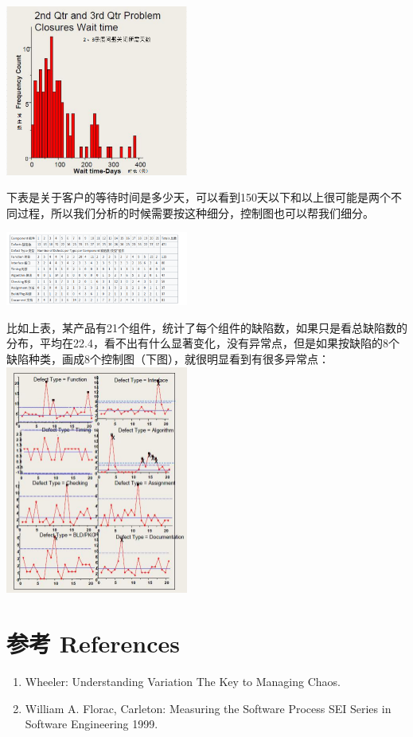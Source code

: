 
\includegraphics[width=6cm]{微信截图_20231026160044.png}

下表是关于客户的等待时间是多少天，可以看到150天以下和以上很可能是两个不同过程，所以我们分析的时候需要按这种细分，控制图也可以帮我们细分。


\includegraphics[width=6cm]{Screenshotfrom2023-10-2622-17-25.png}

比如上表，某产品有21个组件，统计了每个组件的缺陷数，如果只是看总缺陷数的分布，平均在22.4，看不出有什么显著变化，没有异常点，但是如果按缺陷的8个缺陷种类，画成8个控制图（下图），就很明显看到有很多异常点：\\

\includegraphics[width=6cm]{DAD_p67.jpg}

\hypertarget{ux9644ux4ef6}{%
\section{参考 References}\label{ux9644ux4ef6}}

\begin{enumerate}
\tightlist
\item
  Wheeler: Understanding Variation The Key to Managing Chaos.
\item
  William A. Florac, Carleton: Measuring the Software Process SEI Series
  in Software Engineering 1999.
\end{enumerate}




